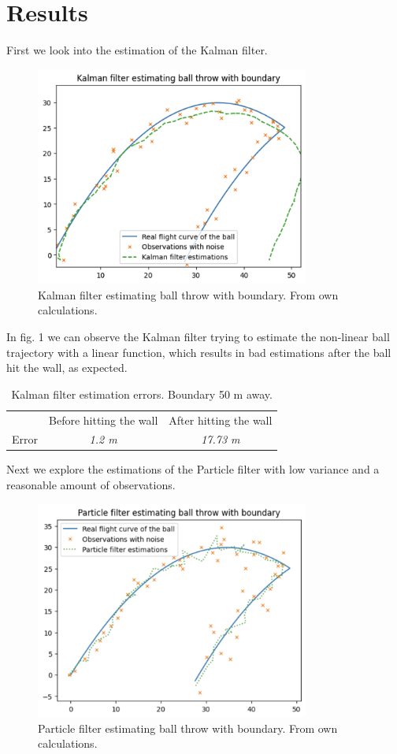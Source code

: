 \documentclass[conference]{IEEEtran}
\begin{document}
\section{Results}

First we look into the estimation of the Kalman filter. 
\begin{figure}[h]
\centerline{\includegraphics[width=90mm]{figs/kalman-filter.png}}
\caption{Kalman filter estimating ball throw with boundary. From own calculations.}
\label{fig:kalman-filter}
\end{figure}

In fig. 1 we can observe the Kalman filter trying to estimate the non-linear ball trajectory with a linear function, which results in bad estimations after the ball hit the wall, as expected. 

\begin{table}[htbp]
    \caption{Kalman filter estimation errors. Boundary 50 m away.}
    \begin{center}
    \begin{tabular}{|c|c|c|}
    \cline{1-3}
    & Before hitting the wall & After hitting the wall \\
    \cline{1-3} 
    Error & \textit{1.2 m} & \textit{17.73 m} \\
    \hline
    \end{tabular}
    \label{tab1}
    \end{center}
\end{table}
Next we explore the estimations of the Particle filter with low variance and a reasonable amount of observations.

\begin{figure}[h]
\centerline{\includegraphics[width=90mm]{figs/particle-filter-knowing.png}}
\caption{Particle filter estimating ball throw with boundary. From own calculations.}
\label{fig:particle-filter-knowing}
\end{figure}
\end{document}
